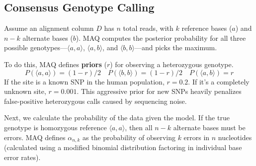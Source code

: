 \subsection{Consensus Genotype Calling}

Assume an alignment column $D$ has $n$ total reads, with $k$ reference bases ($a$) and $n-k$ alternate bases ($b$). MAQ computes the posterior probability for all three possible genotypes—$\langle a,a \rangle$, $\langle a,b \rangle$, and $\langle b,b \rangle$—and picks the maximum.

To do this, MAQ defines \textbf{priors} ($r$) for observing a heterozygous genotype. 
\[
P(\langle a, a \rangle) = (1 - r) / 2 \quad P(\langle b, b \rangle) = (1 - r) / 2 \quad P(\langle a, b \rangle) = r
\]
If the site is a known SNP in the human population, $r=0.2$. If it's a completely unknown site, $r=0.001$. \sta This aggressive prior for new SNPs heavily penalizes false-positive heterozygous calls caused by sequencing noise.

Next, we calculate the probability of the data given the model.
If the true genotype is homozygous reference $\langle a,a \rangle$, then all $n-k$ alternate bases must be errors. MAQ defines $\alpha_{n,k}$ as the probability of observing $k$ errors in $n$ nucleotides (calculated using a modified binomial distribution factoring in individual base error rates).

